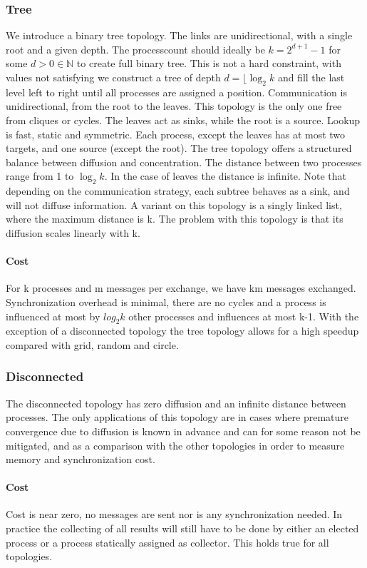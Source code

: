 \subsubsection{Tree}
We introduce a binary tree topology. The links are unidirectional, with a single root and a given depth. The processcount should ideally be $k = 2^{d+1} -1$ for some $d > 0 \in \mathbb{N}$ to create full binary tree. This is not a hard constraint, with values not satisfying we construct a tree of depth $ d =\lfloor\log_2{k}$ and fill the last level left to right until all processes are assigned a position. Communication is unidirectional, from the root to the leaves. This topology is the only one free from cliques or cycles. The leaves act as sinks, while the root is a source. Lookup is fast, static and symmetric. Each process, except the leaves has at most two targets, and one source (except the root). The tree topology offers a structured balance between diffusion and concentration. The distance between two processes range from 1 to $\log_2{k}$. In the case of leaves the distance is infinite. Note that depending on the communication strategy, each subtree behaves as a sink, and will not diffuse information.
A variant on this topology is a singly linked list, where the maximum distance is k. The problem with this topology is that its diffusion scales linearly with k.
\paragraph{Cost}
For k processes and m messages per exchange, we have km messages exchanged. Synchronization overhead is minimal, there are no cycles and a process is influenced at most by $log_2{k}$ other processes and influences at most k-1. With the exception of a disconnected topology the tree topology allows for a high speedup compared with grid, random and circle. 
\subsubsection{Disconnected}
The disconnected topology has zero diffusion and an infinite distance between processes. The only applications of this topology are in cases where premature convergence due to diffusion is known in advance and can for some reason not be mitigated, and as a comparison with the other topologies in order to measure memory and synchronization cost. 
\paragraph{Cost}
Cost is near zero, no messages are sent nor is any synchronization needed. In practice the collecting of all results will still have to be done by either an elected process or a process statically assigned as collector. This holds true for all topologies.
